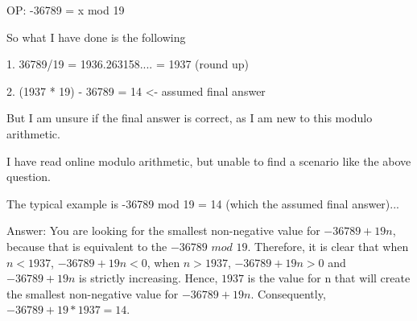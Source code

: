 OP:
-36789 = x mod 19

So what I have done is the following

1.  36789/19 = 1936.263158.... 
             = 1937 (round up)

2.  (1937 * 19) - 36789 = 14 <- assumed final answer

But I am unsure if the final answer is correct, as I am new to this modulo arithmetic.

I have read online modulo arithmetic, but unable to find a scenario like the above question.

The typical example is -36789 mod 19 = 14 (which the assumed final answer)... 

Answer:
You are looking for the smallest non-negative value for $-36789+19n$, because that is equivalent to the $-36789$ $mod$ $19$. Therefore, it is clear that when $n<1937$, $-36789+19n <0$, when $n>1937$, $-36789+19n >0$ and $-36789+19n$  is strictly increasing. Hence, $1937$ is the value for n that will create the smallest non-negative value for $-36789+19n$. Consequently, $-36789+19*1937=14$.
